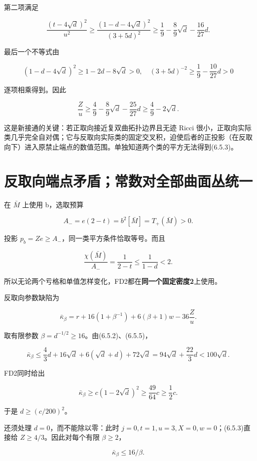 \documentclass[UTF8,11pt,openany,fontset=none]{ctexbook}
\theoremstyle{definition}
\theoremstyle{remark}
\begin{document}
第二项满足

\[
\frac{(t-4\sqrt d)^2}{u^2}
\ge\frac{(1-d-4\sqrt d)^2}{(3+5d)^2}
\ge\frac19-\frac89\sqrt d-\frac{16}{27}d.
\]

最后一个不等式由

\[
(1-d-4\sqrt d)^2\ge1-2d-8\sqrt d>0,
\quad
(3+5d)^{-2}\ge\frac19-\frac{10}{27}d>0
\]

逐项相乘得到。因此

\[
\frac Zu\ge\frac49-\frac89\sqrt d-\frac{25}{27}d
\ge\boxed{\frac49-2\sqrt d.}
\tag{6.5.5}
\]

这是新接通的关键：若正取向接近复双曲拓扑边界且无迹 Ricci 很小，正取向实际类几乎完全自对偶；它与反取向实际类的固定交叉积，迫使后者的正投影（在反取向下）进入原禁止端点的数值范围。单独知道两个类的平方无法得到(6.5.3)。

\section{反取向端点矛盾；常数对全部曲面丛统一}\label{v6-ux53cdux53d6ux5411ux7aefux70b9ux77dbux76feux5e38ux6570ux5bf9ux5168ux90e8ux66f2ux9762ux4e1bux7edfux4e00}

在 \(\bar M\) 上使用 b，选取预算

\[
A_-=e(2-t)=b^2[\bar M]=T_+(\bar M)>0.
\]

投影 \(p_b=Ze\ge A_-\)，同一类平方条件恰取等号。而且

\[
\frac{\chi(\bar M)}{A_-}=\frac1{2-t}
\le\frac1{1-d}<2.
\tag{6.6.1}
\]

所以无论两个亏格和单值怎样变化，FD2都在\textbf{同一个固定密度2}上使用。

反取向参数缺陷为

\[
\bar\kappa_\beta
=r+16(1+\beta^{-1})+6(\beta+1)w-36\frac Zu.
\tag{6.6.2}
\]

取有限参数 \(\beta=d^{-1/2}\ge16\)。由(6.5.2)、(6.5.5)，

\[
\bar\kappa_\beta
\le\frac43d+16\sqrt d+6(\sqrt d+d)+72\sqrt d
=94\sqrt d+\frac{22}{3}d
<100\sqrt d.
\tag{6.6.3}
\]

FD2同时给出

\[
\bar\kappa_\beta\ge c(1-2\sqrt d)^2
\ge\frac{49}{64}c\ge\frac12c.
\tag{6.6.4}
\]

于是 \(d\ge(c/200)^2\)。

还须处理 \(d=0\)，而不能除以零：此时 \(j=0,t=1,u=3,X=0,w=0\)；(6.5.3)直接给 \(Z\ge4/3\)。因此对每个有限 \(\beta\ge2\)，

\[
\bar\kappa_\beta\le16/\beta.
\]
\end{document}
